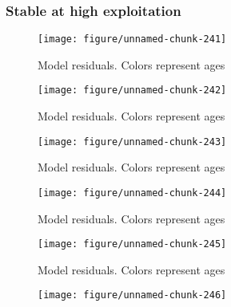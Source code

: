 \documentclass[a4paper]{article}\usepackage{graphicx, color}
\makeatletter
\def\maxwidth{ %
  \ifdim\Gin@nat@width>\linewidth
    \linewidth
  \else
    \Gin@nat@width
  \fi
}
\newenvironment{knitrout}{}{} %
\makeatother
\begin{document}
\subsubsection*{Stable at high exploitation}

\begin{knitrout}
\color{fgcolor}\begin{figure}[H]


{\centering \texttt{[image: figure/unnamed-chunk-241]} 

}

\caption[Model residuals]{Model residuals. Colors represent ages\label{fig:unnamed-chunk-241}}
\end{figure}
\begin{figure}[H]


{\centering \texttt{[image: figure/unnamed-chunk-242]} 

}

\caption[Model residuals]{Model residuals. Colors represent ages\label{fig:unnamed-chunk-242}}
\end{figure}
\begin{figure}[H]


{\centering \texttt{[image: figure/unnamed-chunk-243]} 

}

\caption[Model residuals]{Model residuals. Colors represent ages\label{fig:unnamed-chunk-243}}
\end{figure}
\begin{figure}[H]


{\centering \texttt{[image: figure/unnamed-chunk-244]} 

}

\caption[Model residuals]{Model residuals. Colors represent ages\label{fig:unnamed-chunk-244}}
\end{figure}
\begin{figure}[H]


{\centering \texttt{[image: figure/unnamed-chunk-245]} 

}

\caption[Model residuals]{Model residuals. Colors represent ages\label{fig:unnamed-chunk-245}}
\end{figure}
\begin{figure}[H]


{\centering \texttt{[image: figure/unnamed-chunk-246]} 

}
\end{figure}
\end{knitrout}
\end{document}
